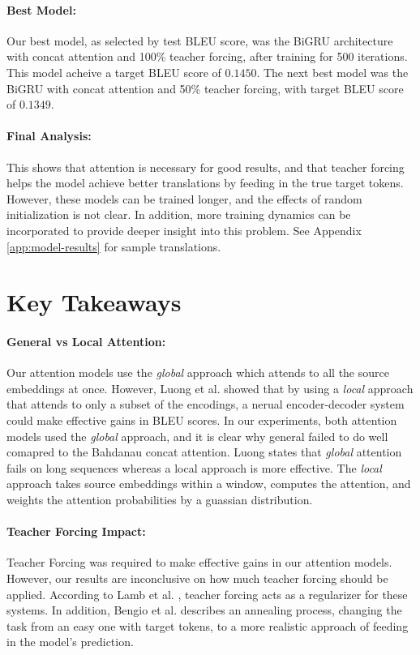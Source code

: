 \documentclass[twoside,twocolumn]{article}
\begin{document}
\paragraph{Best Model:}
Our best model, as selected by test BLEU score, was the BiGRU architecture
with concat attention and 100\% teacher forcing, after training for 500
iterations. This model acheive a target BLEU score of $0.1450$. The next best
model was the BiGRU with concat attention and 50\% teacher forcing, with target
BLEU score of $0.1349$.
\paragraph{Final Analysis:}
This shows that attention is necessary for good results, and that teacher
forcing helps the model achieve better translations by feeding in the true
target tokens. However, these models can be trained longer, and the effects
of random initialization is not clear. In addition, more training dynamics can
be incorporated to provide deeper insight into this problem. See Appendix
\ref{app:model-results} for sample translations.
\section{Key Takeaways}
\label{sec:key-takeaway}
\paragraph{General vs Local Attention:}
\label{sec:key-attention}
Our attention models use the \emph{global} approach which attends to all the
source embeddings at once. However, Luong et al. \cite{luong2015effective}
showed that by using a \emph{local} approach that attends to only a subset
of the encodings, a nerual encoder-decoder system could make effective gains in
BLEU scores. In our experiments, both attention models used the \emph{global}
approach, and it is clear why general failed to do well comapred to the
Bahdanau concat attention. Luong states that \emph{global}
attention fails on long sequences whereas a local approach is more effective.
The \emph{local} approach takes
source embeddings within a window, computes the attention, and weights the
attention probabilities by a guassian distribution.
\paragraph{Teacher Forcing Impact:}
Teacher Forcing was required to make effective gains in our attention models.
However, our results are inconclusive on how much teacher forcing should be
applied. According to Lamb et al. \cite{lamb2016professor}, teacher forcing
acts as a regularizer for these systems. In addition, Bengio et al.
\cite{DBLP:journals/corr/BengioVJS15} describes an annealing
process, changing the task from an easy one with target tokens, to a more
realistic approach of feeding in the model's prediction.
\end{document}
